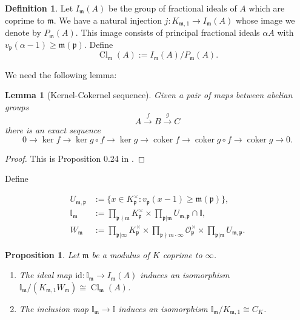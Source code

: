 \documentclass[12pt,reqno]{amsart}
\newcommand{\mm}{\mathfrak{m}}
\newcommand{\OO}{\mathcal{O}}
\newcommand{\pp}{\mathfrak{p}}
\newcommand{\II}{\mathbb{I}}
\DeclareMathOperator{\Cl}{Cl}
\DeclareMathOperator{\coker}{coker}
\newtheorem{prop}[thm]{Proposition}
\newtheorem{lem}[thm]{Lemma}
\theoremstyle{definition}
\newtheorem{defn}[thm]{Definition}
\begin{document}
\begin{defn}
  Let $I_{\mm}(A)$ be the group of fractional ideals of $A$ which are
  coprime to $\mm$. We have a natural injection
  $j: K_{\mm,1}\to I_{\mm}(A)$ whose image we denote by
  $P_{\mm}(A)$. This image consists of principal fractional ideals
  $\alpha A$ with $v_{\pp}(\alpha-1)\geq \mm(\pp)$.  Define
  \[
  \Cl_{\mm}(A):=I_{\mm}(A)/P_{\mm}(A).
  \]
\end{defn}



We need the following lemma:



\begin{lem}[Kernel-Cokernel sequence]
Given a pair of maps between abelian groups 
\[
A \xrightarrow{f} B \xrightarrow{g} C
\]
there is an exact sequence 
\[
0 \to \ker f \to \ker g\circ f \to \ker g \to \coker f \to \coker g\circ f \to \coker g \to 0.
\]
\end{lem}
\begin{proof}
This is
Proposition 0.24 in \cite{milne2006}.
\end{proof}


Define 

\begin{align*}
U_{\mm,\pp}&:=\{x\in K_{\pp}^{\times}: v_{\pp}(x-1)\geq \mm(\pp)\},\\ 
\II_{\mm}&:= \prod_{\pp\nmid \mm} K_{\pp}^{\times} \times \prod_{\pp|\mm} U_{\mm,\pp} \cap \II,\\ 
W_{\mm}&:= \prod_{\pp|\infty} K_{\pp}^{\times} \times \prod_{\pp\nmid m\cdot\infty} \OO_{\pp}^{\times} \times \prod_{\pp|\mm} U_{\mm,\pp}.
\end{align*}

\begin{prop}\label{raysasideles}
Let $\mm$ be a modulus of $K$ coprime to $\infty$. 
\begin{enumerate}
\item The ideal map $\text{id}: \II_\mm \to I_{\mm}(A)$ induces an isomorphism $\II_{\mm}/(K_{\mm,1}W_{\mm})\cong \Cl_{\mm}(A)$.
\item The inclusion map $\II_{\mm}\to \II$ induces an isomorphism $\II_{\mm}/K_{\mm,1}\cong C_K$.
\end{enumerate}
\end{prop}
\end{document}
